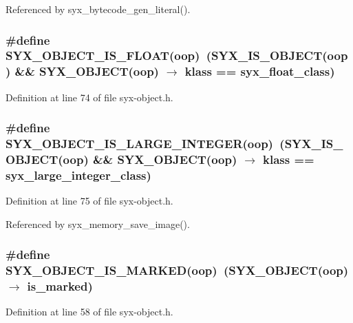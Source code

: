 Referenced by syx\_\-bytecode\_\-gen\_\-literal().\hypertarget{syx-object_8h_ed76a2c170663e7169be0e737e8069a8}{
\subsubsection{\setlength{\rightskip}{0pt plus 5cm}\#define SYX\_\-OBJECT\_\-IS\_\-FLOAT(oop)~(SYX\_\-IS\_\-OBJECT(oop) \&\& SYX\_\-OBJECT(oop) $\rightarrow$ klass == {\bf syx\_\-float\_\-class})}}
\label{syx-object_8h_ed76a2c170663e7169be0e737e8069a8}




Definition at line 74 of file syx-object.h.\hypertarget{syx-object_8h_93ab1383db7e0cafc185af9d9ef1e591}{
\subsubsection{\setlength{\rightskip}{0pt plus 5cm}\#define SYX\_\-OBJECT\_\-IS\_\-LARGE\_\-INTEGER(oop)~(SYX\_\-IS\_\-OBJECT(oop) \&\& SYX\_\-OBJECT(oop) $\rightarrow$ klass == {\bf syx\_\-large\_\-integer\_\-class})}}
\label{syx-object_8h_93ab1383db7e0cafc185af9d9ef1e591}




Definition at line 75 of file syx-object.h.

Referenced by syx\_\-memory\_\-save\_\-image().\hypertarget{syx-object_8h_b510a0c36e6c8a70adde04426625ca7a}{
\subsubsection{\setlength{\rightskip}{0pt plus 5cm}\#define SYX\_\-OBJECT\_\-IS\_\-MARKED(oop)~(SYX\_\-OBJECT(oop) $\rightarrow$ is\_\-marked)}}
\label{syx-object_8h_b510a0c36e6c8a70adde04426625ca7a}




Definition at line 58 of file syx-object.h.

